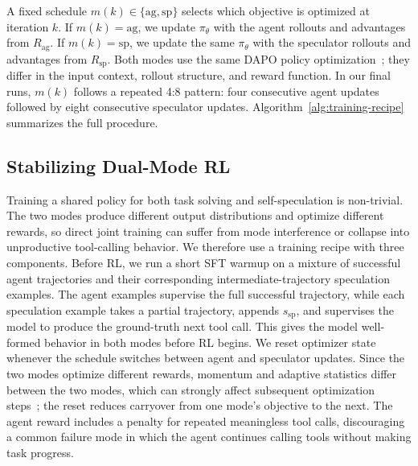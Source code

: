 A fixed schedule $m(k)\in\{\mathrm{ag},\mathrm{sp}\}$ selects which objective is
optimized at iteration $k$. If $m(k)=\mathrm{ag}$, we update
$\pi_\theta$ with the agent rollouts and advantages from $R_{\mathrm{ag}}$.
If $m(k)=\mathrm{sp}$, we update the same $\pi_\theta$ with the speculator
rollouts and advantages from $R_{\mathrm{sp}}$. Both modes use the same
DAPO policy optimization~\citep{yu2025dapo}; they differ in the input context, rollout structure,
and reward function. In our final runs, $m(k)$ follows a repeated 4:8
pattern: four consecutive agent updates followed by eight consecutive
speculator updates. Algorithm~\ref{alg:training-recipe} summarizes the full procedure.

\subsection{Stabilizing Dual-Mode RL}
\label{sec:method:training-recipe}

Training a shared policy for both task solving and self-speculation is
non-trivial. The two modes produce different output distributions and optimize
different rewards, so direct joint training can suffer from mode interference or
collapse into unproductive tool-calling behavior. We therefore use a training
recipe with three components.  Before RL, we run a short SFT warmup
on a mixture of successful agent trajectories and their corresponding
intermediate-trajectory speculation examples. The agent examples supervise the
full successful trajectory, while each speculation example takes a partial
trajectory, appends $s_{\mathrm{sp}}$, and supervises the model to produce the
ground-truth next tool call. This gives the model well-formed behavior in both
modes before RL begins.  We reset optimizer state whenever the
schedule switches between agent and speculator updates. Since the two modes optimize different rewards, 
momentum and adaptive statistics differ between the two modes, which can strongly affect subsequent optimization
steps~\citep{sutskever2013momentum,kingma2015adam}; the reset reduces carryover
from one mode's objective to the next.  The agent reward includes a
penalty for repeated meaningless tool calls, discouraging a common failure mode
in which the agent continues calling tools without making task progress.


